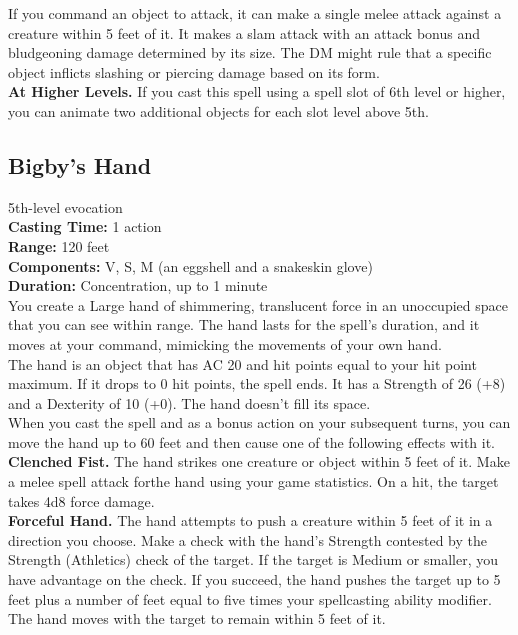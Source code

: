 \documentclass[11pt, A4paper, english]{article}
\begin{document}
If you command an object to attack, it can make a single melee attack against a creature within 5 feet of it. It makes a slam attack with an attack bonus and bludgeoning damage determined by its size. The DM might rule that a specific object inflicts slashing or piercing damage based on its form. \\
\textbf{At Higher Levels.} If you cast this spell using a spell slot of 6th level or higher, you can animate two additional objects for each slot level above 5th.

		\subsection{Bigby’s Hand}
5th-level evocation \\
\textbf{Casting Time:} 1 action \\
\textbf{Range:} 120 feet \\
\textbf{Components:} V, S, M (an eggshell and a snakeskin glove) \\
\textbf{Duration:} Concentration, up to 1 minute \\
You create a Large hand of shimmering, translucent force in an unoccupied space that you can see within range. The hand lasts for the spell’s duration, and it moves at your command, mimicking the movements of your own hand. \\
The hand is an object that has AC 20 and hit points equal to your hit point maximum. If it drops to 0 hit points, the spell ends. It has a Strength of 26 (+8) and a Dexterity of 10 (+0). The hand doesn’t fill its space. \\
When you cast the spell and as a bonus action on your subsequent turns, you can move the hand up to 60 feet and then cause one of the following effects with it. \\
\textbf{Clenched Fist.} The hand strikes one creature or object within 5 feet of it. Make a melee spell attack forthe hand using your game statistics. On a hit, the target takes 4d8 force damage. \\
\textbf{Forceful Hand.} The hand attempts to push a creature within 5 feet of it in a direction you choose. Make a check with the hand’s Strength contested by the Strength (Athletics) check of the target. If the target is Medium or smaller, you have advantage on the check. If you succeed, the hand pushes the target up to 5 feet plus a number of feet equal to five times your spellcasting ability modifier. The hand moves with the target to remain within 5 feet of it. \\
\end{document}
